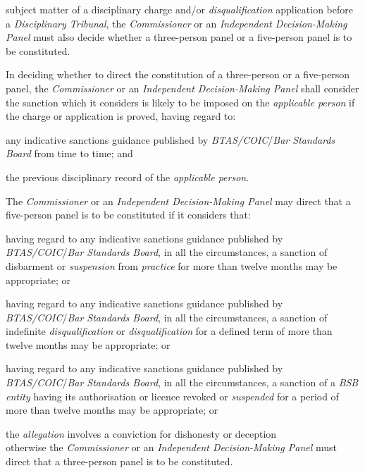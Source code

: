 subject matter of a disciplinary charge
and/or \emph{disqualification} application before a \emph{Disciplinary
Tribunal}, the \emph{Commissioner }or an \emph{Independent
Decision-Making Panel }must also decide whether a three-person panel or
a five-person panel is to be constituted.\\
\par
In deciding whether to direct the constitution of a three-person or a
five-person panel, the \emph{Commissioner }or an \emph{Independent
Decision-Making Panel }shall consider the sanction which it considers is
likely to be imposed on the \emph{applicable person} if the charge or
application is proved, having regard to:\\\nl \item any indicative sanctions guidance published
by \emph{BTAS/COIC}/\emph{Bar Standards Board} from time to time; and\item the previous disciplinary record of the \emph{applicable person}.\ln
{}\par
The \emph{Commissioner }or an \emph{Independent Decision-Making
Panel }may direct that a five-person panel is to be constituted if it
considers that:\\\nl \item having regard to any indicative sanctions guidance published
by \emph{BTAS/COIC}/\emph{Bar Standards Board}, in all the
circumstances, a sanction of disbarment
or \emph{suspension} from \emph{practice} for more than twelve months
may be appropriate; or\item having regard to any indicative sanctions guidance published
by \emph{BTAS/COIC}/\emph{Bar Standards Board}, in all the
circumstances, a sanction of
indefinite \emph{disqualification} or \emph{disqualification }for a
defined term of more than twelve months may be appropriate; or\item having regard to any indicative sanctions guidance published
by \emph{BTAS/COIC}/\emph{Bar Standards Board}, in all the
circumstances, a sanction of a \emph{BSB entity} having its
authorisation or licence revoked or \emph{suspended} for a period of
more than twelve months may be appropriate; or\item the \emph{allegation} involves a conviction for dishonesty or
deception\\
otherwise the \emph{Commissioner }or an \emph{Independent
Decision-Making Panel }must direct that a three-person panel is to be
constituted.\ln
{}\par
